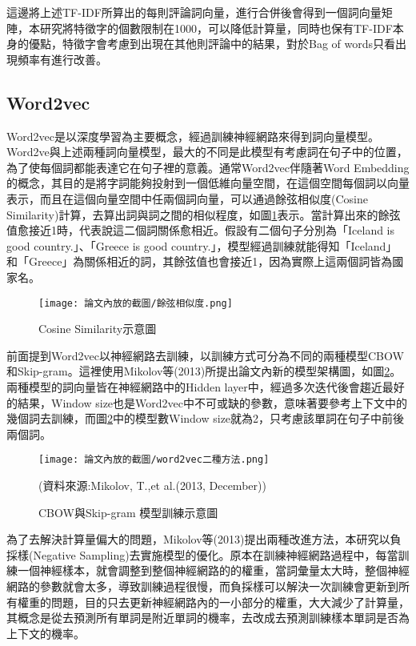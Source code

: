 	這邊將上述TF-IDF所算出的每則評論詞向量，進行合併後會得到一個詞向量矩陣，本研究將特徵字的個數限制在1000，可以降低計算量，同時也保有TF-IDF本身的優點，特徵字會考慮到出現在其他則評論中的結果，對於Bag of words只看出現頻率有進行改善。
	
\newpage
	
\subsection{Word2vec}
	
	Word2vec是以深度學習為主要概念，經過訓練神經網路來得到詞向量模型。Word2ve與上述兩種詞向量模型，最大的不同是此模型有考慮詞在句子中的位置，為了使每個詞都能表達它在句子裡的意義。通常Word2vec伴隨著Word Embedding的概念，其目的是將字詞能夠投射到一個低維向量空間，在這個空間每個詞以向量表示，而且在這個向量空間中任兩個詞向量，可以通過餘弦相似度(Cosine Similarity)計算，去算出詞與詞之間的相似程度，如圖\ref{Fi3g8}表示。當計算出來的餘弦值愈接近1時，代表說這二個詞關係愈相近。假設有二個句子分別為「Iceland is good country.」、「Greece is good country.」，模型經過訓練就能得知「Iceland」 和「Greece」為關係相近的詞，其餘弦值也會接近1，因為實際上這兩個詞皆為國家名。
	
	\begin{figure}[H]
	\centering
	\texttt{[image: 論文內放的截圖/餘弦相似度.png]}
	\caption{Cosine Similarity示意圖}
	\label{Fi3g8}
	\end{figure}
	
\newpage

	前面提到Word2vec以神經網路去訓練，以訓練方式可分為不同的兩種模型CBOW和Skip-gram。這裡使用Mikolov等(2013)所提出論文內新的模型架構圖，如圖\ref{Fi3g9}。兩種模型的詞向量皆在神經網路中的Hidden layer中，經過多次迭代後會趨近最好的結果，Window size也是Word2vec中不可或缺的參數，意味著要參考上下文中的幾個詞去訓練，而圖\ref{Fi3g9}中的模型數Window size就為2，只考慮該單詞在句子中前後兩個詞。\\
	
	\begin{figure}[H]
	\centering
	\texttt{[image: 論文內放的截圖/word2vec二種方法.png]}
	\caption{CBOW與Skip-gram 模型訓練示意圖}
	\label{Fi3g9}
	(資料來源:Mikolov, T.,et al.(2013, December))
	\end{figure}
	
	為了去解決計算量偏大的問題，Mikolov等(2013)提出兩種改進方法，本研究以負採樣(Negative Sampling)去實施模型的優化。原本在訓練神經網路過程中，每當訓練一個神經樣本，就會調整到整個神經網路的的權重，當詞彙量太大時，整個神經網路的參數就會太多，導致訓練過程很慢，而負採樣可以解決一次訓練會更新到所有權重的問題，目的只去更新神經網路內的一小部分的權重，大大減少了計算量，其概念是從去預測所有單詞是附近單詞的機率，去改成去預測訓練樣本單詞是否為上下文的機率。
	
